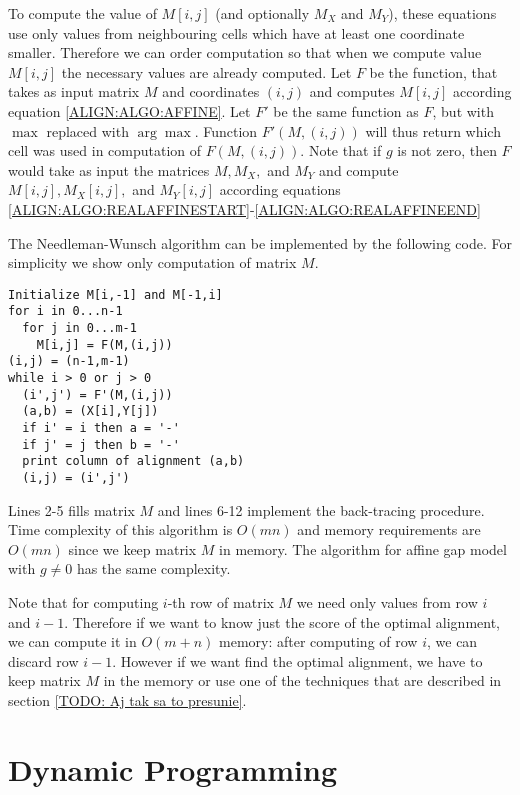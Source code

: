 To compute the
value of $M[i,j]$ (and optionally $M_X$ and $M_Y$), these equations use only values
from neighbouring cells which have at least one coordinate smaller. 
Therefore we can order computation so that when we compute value $M[i,j]$ the
necessary values are already computed.
Let $F$ be
the function, that takes as input matrix $M$  and coordinates $(i,j)$ and computes $M[i,j]$ according equation
\ref{ALIGN:ALGO:AFFINE}.  Let $F'$ be the
same function as $F$, but with $\max$ replaced with $\arg\max$.  Function
$F'(M,(i,j))$ will thus return which cell was used in computation of $F(M,(i,j))$.
Note that if $g$ is not zero, then $F$ would take as input the matrices $M,M_X,$
and $M_Y$ and compute $M[i,j],M_X[i,j],$ and $M_Y[i,j]$ according 
 equations
\ref{ALIGN:ALGO:REALAFFINESTART}-\ref{ALIGN:ALGO:REALAFFINEEND}

The Needleman-Wunsch algorithm can be implemented by the following code. For simplicity 
we show only computation of matrix $M$.

\lstset{showstringspaces=false}
\begin{lstlisting}
Initialize M[i,-1] and M[-1,i]
for i in 0...n-1
  for j in 0...m-1
    M[i,j] = F(M,(i,j))
(i,j) = (n-1,m-1)
while i > 0 or j > 0
  (i',j') = F'(M,(i,j))
  (a,b) = (X[i],Y[j])
  if i' = i then a = '-'
  if j' = j then b = '-'
  print column of alignment (a,b)
  (i,j) = (i',j')
\end{lstlisting}

Lines 2-5 fills matrix $M$ and lines 6-12 implement the back-tracing procedure.
Time complexity of this algorithm is $O(mn)$ and memory requirements are $O(mn)$
since we keep matrix $M$ in memory. The algorithm for
affine gap model with $g\not=0$ has the same complexity.


Note that for computing  $i$-th row of matrix $M$ we need only values from row
$i$ and $i-1$. Therefore if we want to know just the score of the optimal
alignment,
we can compute it in $O(m+n)$ memory: after computing of row $i$, we can discard
row $i-1$. However if we want find the optimal alignment, we have to keep matrix
$M$ in the memory or use one of the techniques that are described in section 
\ref{TODO: Aj tak sa to presunie}.


\section{Dynamic Programming}  


